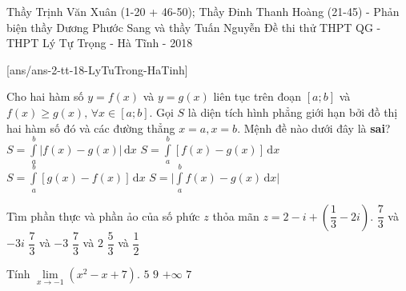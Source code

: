 \begin{name}
{Thầy Trịnh Văn Xuân (1-20 + 46-50); Thầy Đinh Thanh Hoàng (21-45) -
Phản biện thầy Dương Phước Sang và thầy Tuấn Nguyễn}
{Đề thi thử THPT QG  - THPT Lý Tự Trọng - Hà Tĩnh - 2018}
\end{name}
\setcounter{ex}{0}

[ans/ans-2-tt-18-LyTuTrong-HaTinh]

\begin{ex}%
Cho hai hàm số $y=f(x)$ và $y=g(x)$ liên tục trên đoạn $[a;b]$ và $f(x)\geq g(x), \, \forall x \in [a;b]$. Gọi $S$ là diện tích hình phẳng giới hạn bởi đồ thị hai hàm số đó và các đường thẳng $x=a, x=b$. Mệnh đề nào dưới đây là \textbf{sai}?
\choice
{$S=\displaystyle\int\limits_{a}^b\left| f(x)-g(x)\right|\mathrm{\,d}x$}
{$S=\displaystyle\int\limits_{a}^b[ f(x)-g(x)]\mathrm{\,d}x$}
{\True $S=\displaystyle\int\limits_{a}^b\left[ g(x)-f(x)\right]\mathrm{\,d}x$}
{$S=\Big| \displaystyle\int\limits_{a}^b f(x)-g(x)\mathrm{\,d}x\Big|$}
\end{ex}

\begin{ex}%
Tìm phần thực và phần ảo của số phức $z$ thỏa mãn $z = 2-i + \left(\dfrac{1}{3}-2i\right)$. 
\choice
{$\dfrac{7}{3}$ và $-3i$}
{\True $\dfrac{7}{3}$ và $-3$}
{$\dfrac{7}{3}$ và $2$}
{$\dfrac{5}{3}$ và $\dfrac{1}{2}$}
\end{ex}

\begin{ex}%
Tính $\lim\limits_{x\to -1}(x^2 -x +7)$.
\choice
{$5$}
{\True $9$}
{$+\infty$}
{$7$}
\end{ex}

